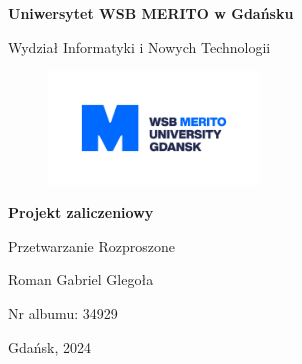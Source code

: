 \begin{titlepage}
    \centering\vspace*{1cm}
    \Large{\textbf{Uniwersytet WSB MERITO w Gdańsku}}\vspace{1.3cm}

    \Large{Wydział Informatyki i Nowych Technologii}\vspace{1.3cm}

    \begin{figure}[h!]
        \centering
        \includegraphics[width=0.5\textwidth]{assets/logo-wsb-merito-gdansk.png}
    \end{figure} \vspace{1.5cm}

    \huge{\textbf{Projekt zaliczeniowy}} \vspace{1.5cm}

    \Large{Przetwarzanie Rozproszone} \vfill

    \Large{Roman Gabriel Glegoła} \vspace{0.8cm}

    \Large{Nr albumu: 34929} \vfill

    \Large{Gdańsk, 2024}
\end{titlepage}